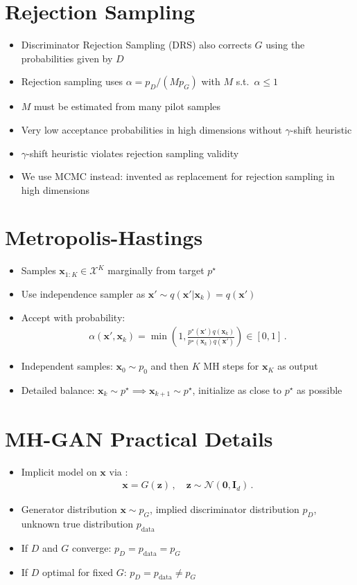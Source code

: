 \documentclass[a0,landscape]{a0poster}
\newcommand{\mysection}[1]{\section*{\fontsize{67.1}{82} \selectfont \color{NavyBlue} #1 \color{Black}}}
\renewcommand{\vec}[1]{{\boldsymbol{\mathbf{#1}}}} %
\newcommand{\R}{\mathbb{R}}
\newcommand{\set}[1]{\mathcal{#1}}
\newcommand{\sample}{\sim}
\newcommand{\given}{|}
\newcommand{\norm}{\mathcal{N}}
\newcommand{\target}{{p^\star}}
\newcommand{\prop}{q}
\newcommand{\pinit}{{p_0}}
\newcommand{\PG}{{p_G}}
\newcommand{\PD}{{p_D}}
\newcommand{\PR}{{p_{\textrm{data}}}}
\newcommand{\accept}{\alpha}
\newcommand{\setx}{\set{X}}
\begin{document}
\begin{multicols}{3}
\mysection{Rejection Sampling}

\begin{itemize}
  \item Discriminator Rejection Sampling (DRS) also corrects $G$ using the probabilities given by $D$
  \item Rejection sampling uses $\accept = p_D/(Mp_G)$ with $M$ s.t.~$\alpha \leq 1$
  \item $M$ must be estimated from many pilot samples
  \item Very low acceptance probabilities in high dimensions without $\gamma$-shift heuristic
  \item $\gamma$-shift heuristic violates rejection sampling validity
  \item We use MCMC instead: invented as replacement for rejection sampling in high dimensions
\end{itemize}

\columnbreak

\mysection{Metropolis-Hastings}

\begin{itemize}
  \item Samples $\vec x_{1:K} \in \setx^K$ marginally from target $\target$
  \item Use independence sampler as $\vec x' \sample \prop(\vec x' \given \vec x_k)=\prop(\vec x')$
  \item Accept with probability:
  \begin{align}
    \accept(\vec x', \vec x_k) = \min\left(1, \frac{\target(\vec x')\prop(\vec x_k)}{\target(\vec x_k)\prop(\vec x')}\right) \in [0,1]\,. \label{eq:alpha def}
  \end{align}
  \item Independent samples: $\vec x_0 \sample \pinit$ and then $K$ MH steps for $\vec x_K$ as output
  \item Detailed balance: $\vec x_k \sample \target \implies \vec x_{k+1} \sample \target$, initialize as close to $\target$ as possible
\end{itemize}

\mysection{MH-GAN Practical Details}

\begin{itemize}
  \item Implicit model on $\vec x$ via \smash{$G \in \R^{d} \rightarrow \setx$}:
  \begin{align}
    \vec x = G(\vec z)\,, \quad \vec z \sample \norm(\vec 0, \vec I_{d})\,.
  \end{align}
  \item Generator distribution $\vec x \sample \PG$, implied discriminator distribution $\PD$, unknown true distribution $\PR$
  \item If $D$ and $G$ converge: $\PD = \PR = \PG$
  \item If $D$ optimal for fixed $G$: $\PD = \PR \neq \PG$
\end{itemize}


\end{multicols}
\end{document}
